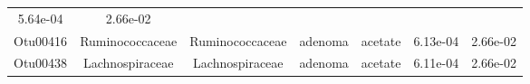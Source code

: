 \documentclass[11pt,]{article}
\begin{document}
\begin{longtable}[]{@{}ccccccc@{}}
\begin{minipage}[t]{0.09\columnwidth}
5.64e-04\strut
\end{minipage} & \begin{minipage}[t]{0.09\columnwidth}\centering\strut
2.66e-02\strut
\end{minipage}\tabularnewline
\begin{minipage}[t]{0.09\columnwidth}\centering\strut
Otu00416\strut
\end{minipage} & \begin{minipage}[t]{0.17\columnwidth}\centering\strut
Ruminococcaceae\strut
\end{minipage} & \begin{minipage}[t]{0.17\columnwidth}\centering\strut
Ruminococcaceae\strut
\end{minipage} & \begin{minipage}[t]{0.09\columnwidth}\centering\strut
adenoma\strut
\end{minipage} & \begin{minipage}[t]{0.11\columnwidth}\centering\strut
acetate\strut
\end{minipage} & \begin{minipage}[t]{0.09\columnwidth}\centering\strut
6.13e-04\strut
\end{minipage} & \begin{minipage}[t]{0.09\columnwidth}\centering\strut
2.66e-02\strut
\end{minipage}\tabularnewline
\begin{minipage}[t]{0.09\columnwidth}\centering\strut
Otu00438\strut
\end{minipage} & \begin{minipage}[t]{0.17\columnwidth}\centering\strut
Lachnospiraceae\strut
\end{minipage} & \begin{minipage}[t]{0.17\columnwidth}\centering\strut
Lachnospiraceae\strut
\end{minipage} & \begin{minipage}[t]{0.09\columnwidth}\centering\strut
adenoma\strut
\end{minipage} & \begin{minipage}[t]{0.11\columnwidth}\centering\strut
acetate\strut
\end{minipage} & \begin{minipage}[t]{0.09\columnwidth}\centering\strut
6.11e-04\strut
\end{minipage} & \begin{minipage}[t]{0.09\columnwidth}\centering\strut
2.66e-02\strut
\end{minipage}\tabularnewline

\end{longtable}
\end{document}
